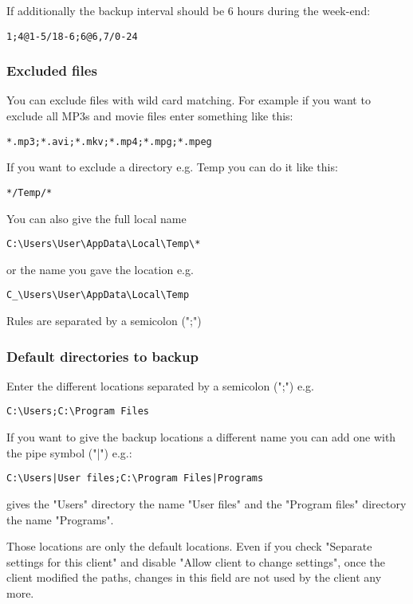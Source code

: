 \documentclass[a4paper,10pt]{article}
\begin{document}
\noindent If additionally the backup interval should be 6 hours during the week-end:

\begin{verbatim}
1;4@1-5/18-6;6@6,7/0-24
\end{verbatim}

\subsubsection{Excluded files}
\label{subsub_excluded_files}

You can exclude files with wild card matching. For example if you want to exclude all MP3s and movie files enter something like this:
\begin{verbatim}
*.mp3;*.avi;*.mkv;*.mp4;*.mpg;*.mpeg
\end{verbatim}
If you want to exclude a directory e.g. Temp you can do it like this:
\begin{verbatim}
*/Temp/*
\end{verbatim}
You can also give the full local name
\begin{verbatim}
C:\Users\User\AppData\Local\Temp\*
\end{verbatim}
or the name you gave the location e.g.
\begin{verbatim}
C_\Users\User\AppData\Local\Temp
\end{verbatim}

Rules are separated by a semicolon (";")

\subsubsection{Default directories to backup}
\label{subsub_default_dirs}

Enter the different locations separated by a semicolon (";") e.g.
\begin{verbatim}
C:\Users;C:\Program Files
\end{verbatim}
If you want to give the backup locations a different name you can add one with the pipe symbol ("|") e.g.:
\begin{verbatim}
C:\Users|User files;C:\Program Files|Programs
\end{verbatim}
gives the "Users" directory the name "User files" and the "Program files" directory the name "Programs".

Those locations are only the default locations. Even if you check "Separate settings for this client" and disable "Allow client to change settings", once the client modified the paths, changes in this field are not used by the client any more.
\end{document}
